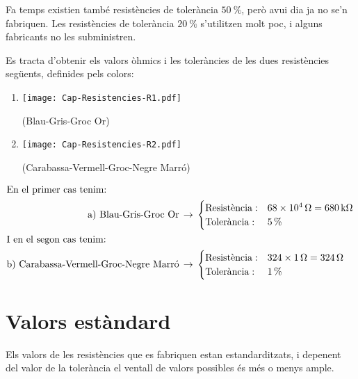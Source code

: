 Fa temps existien també resistències de tolerància $\SI{50}{\percent}$,
però avui dia ja no se'n fabriquen. Les resistències de tolerància $\SI{20}{\percent}$ s'utilitzen molt poc, i alguns fabricants no les subministren.


\begin{exemple}
   Es tracta d'obtenir els valors òhmics i les toleràncies de les dues resistències següents,
   definides pels colors:
    \begin{enumerate}
       \renewcommand{\labelenumi}{\alph{enumi})}
       \item \begin{minipage}{1.8cm}
               \texttt{[image: Cap-Resistencies-R1.pdf]}
            \end{minipage} (Blau-Gris-Groc Or)
       \item  \begin{minipage}{1.8cm}
               \texttt{[image: Cap-Resistencies-R2.pdf]}
            \end{minipage} (Carabassa-Vermell-Groc-Negre Marró)
    \end{enumerate}
    \begin{align*}
       \intertext{En el primer cas tenim:}
       \text{a) Blau-Gris-Groc Or}\,  &\rightarrow\,
       \begin{cases}
          \text{Resistència}: &\SI{68e4}{\ohm} = \SI{680}{k\ohm} \\
          \text{Tolerància}:  &\SI{5}{\percent}
       \end{cases} \\
       \intertext{I en el segon cas tenim:}
       \text{b) Carabassa-Vermell-Groc-Negre Marró}\,  &\rightarrow\,
       \begin{cases}
          \text{Resistència}: &324 \times \SI{1}{\ohm} = \SI{324}{\ohm} \\
          \text{Tolerància}:  &\SI{1}{\percent}
       \end{cases}
    \end{align*}
\end{exemple}

\section{Valors estàndard} 

Els valors de les resistències que es fabriquen estan estandarditzats, i depenent
del valor de la tolerància el ventall de valors possibles és més o menys ample.

